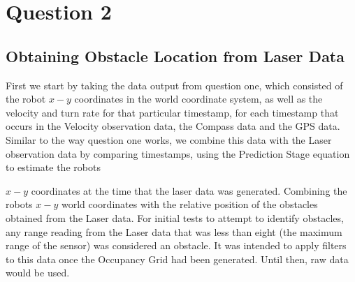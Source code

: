 \pagebreak
\section{Question 2}
	
	\subsection{Obtaining Obstacle Location from Laser Data}
	
	First we start by taking the data output from question one, which consisted of the robot ${x-y}$ coordinates in the world coordinate system, as well as the velocity and turn rate for that particular timestamp, for each timestamp that occurs in the Velocity observation data, the Compass data and the GPS data. \newline Similar to the way question one works, we combine this data with the Laser observation data by comparing timestamps, using the Prediction Stage equation to estimate the robots {${x-y}$ coordinates at the time that the laser data was generated. Combining the robots ${x-y}$ world coordinates with the relative position of the obstacles obtained from the Laser data. \newline
	For initial tests to attempt to identify obstacles, any range reading from the Laser data that was less than eight (the maximum range of the sensor) was considered an obstacle. It was intended to apply filters to this data once the Occupancy Grid had been generated. Until then, raw data would be used.\newline
	
	
	
	
}
